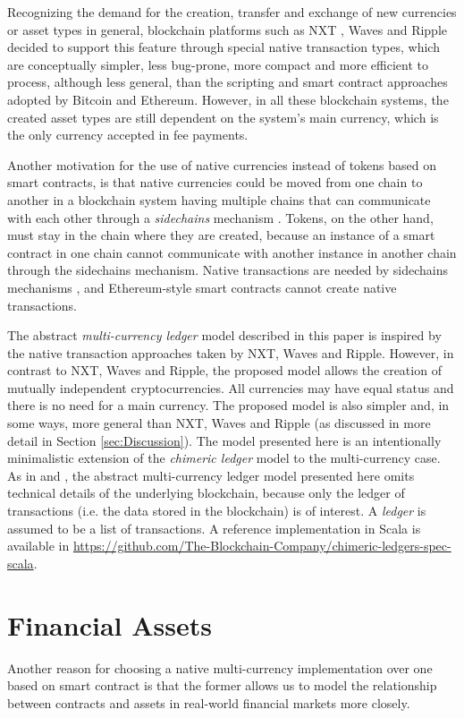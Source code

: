 \documentclass{llncs}
\begin{document}
Recognizing the demand for the creation, transfer and exchange of new currencies or asset types in general, blockchain platforms such as NXT \cite{NXT}, Waves \cite{Waves} and Ripple \cite{Ripple} decided to support this feature through special native transaction types, which are conceptually simpler, less bug-prone, more compact and more efficient to process, although less general, than the scripting and smart contract approaches adopted by Bitcoin and Ethereum. However, in all these blockchain systems, the created asset types are still dependent on the system's main currency, which is the only currency accepted in fee payments.

Another motivation for the use of native currencies instead of tokens based on smart contracts, is that native currencies could be moved from one chain to another in a blockchain system having multiple chains that can communicate with each other through a \emph{sidechains} mechanism \cite{Sidechains,SidechainsShardagnostic}. Tokens, on the other hand, must stay in the chain where they are created, because an instance of a smart contract in one chain cannot communicate with another instance in another chain through the sidechains mechanism. Native transactions are needed by sidechains mechanisms \cite{SidechainsShardagnostic}, and Ethereum-style smart contracts cannot create native transactions.

The abstract \emph{multi-currency ledger} model described in this paper is inspired by the native transaction approaches taken by NXT, Waves and Ripple. However, in contrast to NXT, Waves and Ripple, the proposed model allows the creation of mutually independent cryptocurrencies. All currencies may have equal status and there is no need for a main currency. The proposed model is also simpler and, in some ways, more general than NXT, Waves and Ripple (as discussed in more detail in Section \ref{sec:Discussion}). The model presented here is an intentionally minimalistic extension of the \emph{chimeric ledger} model \cite{ChimericLedgers} to the multi-currency case. As in \cite{ChimericLedgers} and \cite{UTxOScripts}, the abstract multi-currency ledger model presented here omits technical details of the underlying blockchain, because only the ledger of transactions (i.e. the data stored in the blockchain) is of interest. A \emph{ledger} is assumed to be a list of transactions.
%
A reference implementation in Scala is available in \url{https://github.com/The-Blockchain-Company/chimeric-ledgers-spec-scala}.

\section{Financial Assets}
Another reason for choosing a native multi-currency implementation over one  based on smart contract is that the former allows us to model the relationship between contracts and assets in real-world financial markets more closely. 
\end{document}
